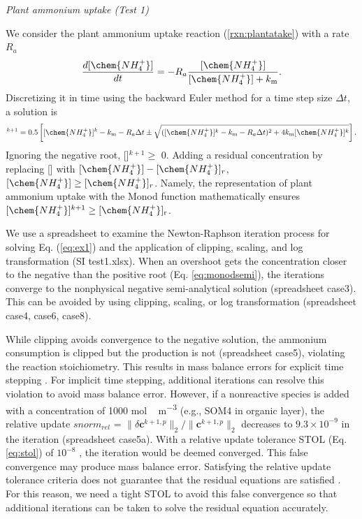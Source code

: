 \documentclass[gmd, manuscript]{copernicus}
\begin{document}
\noindent \emph{Plant ammonium uptake (Test 1)}

We consider the plant ammonium uptake reaction (\ref{rxn:plantatake}) with a
rate $R_a$
\begin{equation}
\frac{d[\chem{NH_4^+}]}{dt} =- R_a \frac{[\chem{NH_4^+}]}{[\chem{NH_4^+}]+k_\text{m}}.
\label{eq:ex1}
\end{equation}
Discretizing it in
time using the backward Euler method for a time step size $\Delta t$, a solution is
\begin{equation}
[\chem{NH_4^+}]^{k+1}=0.5 \left[[\chem{NH_4^+}]^k - k_\text{m} - R_a \Delta t
\pm \sqrt{([\chem{NH_4^+}]^k - k_\text{m} - R_a\Delta t)^2 + 4
k_\text{m}[\chem{NH_4^+}]^k}\right].
\label{eq:monodsemi}
\end{equation}
Ignoring the negative root, []$^{k+1}\geq$
0. Adding a residual concentration by replacing [] with
$[\chem{NH_4^+}]-[\chem{NH_4^+}]_r$, $[\chem{NH_4^+}]\geq[\chem{NH_4^+}]_r$.
Namely, the representation of plant ammonium uptake with the Monod function
mathematically ensures $[\chem{NH_4^+}]^{k+1} \geq [\chem{NH_4^+}]_\text{r}$. 

We use a spreadsheet to examine the Newton-Raphson iteration process for solving
Eq. (\ref{eq:ex1}) and the application of clipping, scaling, and log
transformation (SI test1.xlsx). When an overshoot gets the concentration closer
to the negative than the positive root (Eq. \ref{eq:monodsemi}), the iterations
converge to the nonphysical negative semi-analytical solution (spreadsheet case3).
This can be avoided by using clipping, scaling, or log transformation (spreadsheet
case4, case6, case8). 

While clipping avoids convergence to the negative solution, the ammonium
consumption is clipped but the  production is not (spreadsheet case5),
violating the reaction stoichiometry. This results in mass balance errors for
explicit time stepping \citep{Tang2015}. For  implicit time stepping,
additional iterations can resolve this violation to avoid mass balance error.
However, if a nonreactive species is added with a concentration of 1000
\unit{mol\,m^{-3}} (e.g., SOM4 in organic layer), the relative update $snorm_{rel}$ =
${\|\delta \mathbf{c}^{k+1,p}\|_2}/{\|\mathbf{c}^{k+1,p} \|_2}$ decreases to
$9.3\times 10^{-9}$ in the iteration (spreadsheet case5a). 
With a relative update
tolerance STOL (Eq. \ref{eq:stol}) of $10^{-8}$ , the iteration would be deemed
converged. This false convergence may produce mass balance error. Satisfying
the relative update tolerance criteria does not guarantee that the residual
equations are satisfied \citep{Lichtner2015}. For this reason, we need a tight
STOL to avoid this false convergence so that additional iterations can be taken
to solve the residual equation accurately. 
 
\end{document}

